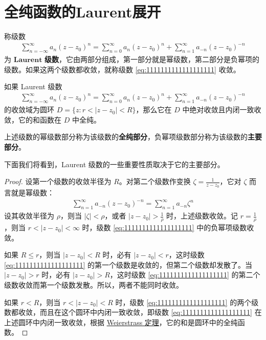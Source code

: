 \documentclass[../../main.tex]{subfiles}%
\begin{document}
\section{全纯函数的Laurent展开}

\begin{definition}
称级数
\begin{align}
\sum_{n = -\infty}^{\infty} a_n (z - z_0)^n = \sum_{n = 0}^{\infty} a_n (z - z_0)^n + \sum_{n = 1}^{\infty} a_{-n} (z - z_0)^{-n} \label{eq:1111111111111111111}
\end{align}
为 $\mathbf{Laurent}$ \textbf{级数}，它由两部分组成，第一部分就是幂级数，第二部分是负幂项的级数。如果这两个级数都收敛，就称级数 \eqref{eq:1111111111111111111} 收敛。
\end{definition}

\begin{theorem}\label{theorem:定理5.1.1}
如果 Laurent 级数
\begin{align*}
\sum_{n = -\infty}^{\infty} a_n (z - z_0)^n = \sum_{n = 0}^{\infty} a_n (z - z_0)^n + \sum_{n = 1}^{\infty} a_{-n} (z - z_0)^{-n}
\end{align*}
的收敛域为圆环 \( D = \{ z: r < |z - z_0| < R \} \)，那么它在 \( D \) 中绝对收敛且内闭一致收敛，它的和函数在 \( D \) 中全纯。

上述级数的幂级数部分称为该级数的\textbf{全纯部分}，负幂项级数部分称为该级数的\textbf{主要部分}。
\end{theorem}
\begin{remark}
下面我们将看到，Laurent 级数的一些重要性质取决于它的主要部分。
\end{remark}
\begin{proof}
设第一个级数的收敛半径为 \( R \)。对第二个级数作变换 \( \zeta = \frac{1}{z - z_0} \)，它对 \( \zeta \) 而言就是幂级数：
\begin{align*}
\sum_{n = 1}^{\infty} a_{-n} (z - z_0)^{-n} = \sum_{n = 1}^{\infty} a_{-n} \zeta^n
\end{align*}
设其收敛半径为 \( \rho \)，则当 \( |\zeta| < \rho \)，或者 \( |z - z_0| > \frac{1}{\rho} \) 时，上述级数收敛。记 \( r = \frac{1}{\rho} \)，则当 \( r < |z - z_0| < \infty \) 时，级数 \eqref{eq:1111111111111111111} 中的负幂项级数收敛。

如果 \( R \leqslant  r \)，则当 \( |z - z_0| < R \) 时，必有 \( |z - z_0| < r \)，这时级数 \eqref{eq:1111111111111111111} 的第一个级数是收敛的，但第二个级数却发散了。当 \( |z - z_0| > r \) 时，必有 \( |z - z_0| > R \)，这时级数 \eqref{eq:1111111111111111111} 的第二个级数收敛而第一个级数发散。所以，两者不能同时收敛。

如果 \( r < R \)，则当 \( r < |z - z_0| < R \) 时，级数 \eqref{eq:1111111111111111111} 的两个级数都收敛，而且在这个圆环中内闭一致收敛，即级数 \eqref{eq:1111111111111111111} 在上述圆环中内闭一致收敛，根据 \hyperref[theorem:Weierstrass定理]{Weierstrass 定理}，它的和是圆环中的全纯函数。
\end{proof}
\end{document}
